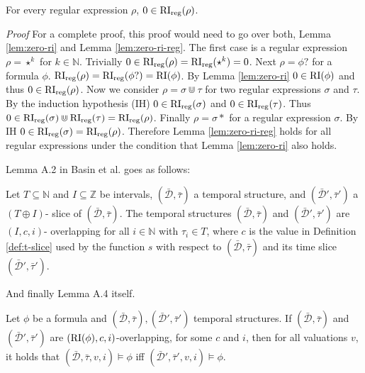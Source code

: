 \begin{lemma}
    \label{lem:zero-ri-reg}
    For every regular expression $\rho$, $0 \in \operatorname{RI}_{\text{reg}}(\rho)$.
\end{lemma}
\textit{Proof}
For a complete proof, this proof would need to go over both, Lemma \ref{lem:zero-ri} and Lemma \ref{lem:zero-ri-reg}.
The first case is a regular expression $\rho = \star^k$ for $k \in \mathbb{N}$.
Trivially $0 \in \operatorname{RI}_{\text{reg}}(\rho) = \operatorname{RI}_{\text{reg}}(\star^k) = {0}$.
Next $\rho = \phi?$ for a formula $\phi$.
$\operatorname{RI}_{\text{reg}}(\rho) = \operatorname{RI}_{\text{reg}}(\phi?) = \operatorname{RI}(\phi)$.
By Lemma \ref{lem:zero-ri} $0 \in \operatorname{RI}(\phi)$ and thus $0 \in \operatorname{RI}_{\text{reg}}(\rho)$.
Now we consider $\rho = \sigma \Cup \tau$ for two regular expressions $\sigma$ and $\tau$.
By the induction hypothesis (IH) $0 \in \operatorname{RI}_{\text{reg}}(\sigma)$ and $0 \in \operatorname{RI}_{\text{reg}}(\tau)$.
Thus $0 \in \operatorname{RI}_{\text{reg}}(\sigma) \Cup \operatorname{RI}_{\text{reg}}(\tau) = \operatorname{RI}_{\text{reg}}(\rho)$.
Finally $\rho = \sigma *$ for a regular expression $\sigma$.
By IH $0 \in \operatorname{RI}_{\text{reg}}(\sigma) = \operatorname{RI}_{\text{reg}}(\rho)$.
Therefore Lemma \ref{lem:zero-ri-reg} holds for all regular expressions under the condition that Lemma \ref{lem:zero-ri} also holds.

Lemma A.2 in Basin et al. \cite{Basin2016} goes as follows:
\begin{lemma}
    \label{lem:slices-overlap}
    Let $T \subseteq \mathbb{N}$ and $I \subseteq \mathbb{Z}$ be intervals, $(\bar{\mathcal{D}}, \bar{\tau})$ a temporal structure, and $(\bar{\mathcal{D}}', \bar{\tau}')$ a $(T \oplus I)$- slice of $(\bar{\mathcal{D}}, \bar{\tau})$.
    The temporal structures $(\bar{\mathcal{D}}, \bar{\tau})$ and $(\bar{\mathcal{D}}', \bar{\tau}')$ are $(I,c,i)$- overlapping for all $i \in \mathbb{N}$ with $\tau_i \in T$, where $c$ is the value in Definition \ref{def:t-slice} used by the function $s$ with respect to $(\bar{\mathcal{D}}, \bar{\tau})$ and its time slice $(\bar{\mathcal{D}}', \bar{\tau}')$.
\end{lemma}

And finally Lemma A.4 itself.
\begin{lemma}
    \label{lem:ri-completness}
    Let $\phi$ be a formula and $(\bar{\mathcal{D}}, \bar{\tau}), (\bar{\mathcal{D}}', \bar{\tau}')$ temporal structures.
    If $(\bar{\mathcal{D}}, \bar{\tau})$ and $(\bar{\mathcal{D}}', \bar{\tau}')$ are $(\operatorname{RI}(\phi),c,i)$-overlapping, for some $c$ and $i$, then for all valuations $v$, it holds that $(\bar{\mathcal{D}}, \bar{\tau},v,i) \models \phi$ iff $(\bar{\mathcal{D}}',\bar{\tau}',v,i) \models \phi$.
\end{lemma}

